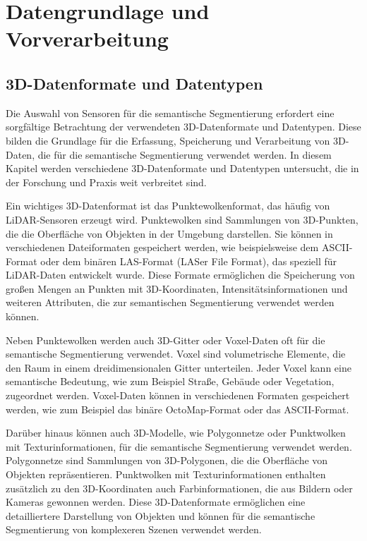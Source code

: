 \chapter{Datengrundlage und Vorverarbeitung}

\section{3D-Datenformate und Datentypen}
Die Auswahl von Sensoren für die semantische Segmentierung erfordert eine
sorgfältige Betrachtung der verwendeten 3D-Datenformate und Datentypen. Diese
bilden die Grundlage für die Erfassung, Speicherung und Verarbeitung von
3D-Daten, die für die semantische Segmentierung verwendet werden. In diesem
Kapitel werden verschiedene 3D-Datenformate und Datentypen untersucht, die in
der Forschung und Praxis weit verbreitet sind.

Ein wichtiges 3D-Datenformat ist das Punktewolkenformat, das häufig von
LiDAR-Sensoren erzeugt wird. Punktewolken sind Sammlungen von 3D-Punkten, die
die Oberfläche von Objekten in der Umgebung darstellen. Sie können in
verschiedenen Dateiformaten gespeichert werden, wie beispielsweise dem
ASCII-Format oder dem binären LAS-Format (LASer File Format), das speziell für
LiDAR-Daten entwickelt wurde. Diese Formate ermöglichen die Speicherung von
großen Mengen an Punkten mit 3D-Koordinaten, Intensitätsinformationen und
weiteren Attributen, die zur semantischen Segmentierung verwendet werden
können.

Neben Punktewolken werden auch 3D-Gitter oder Voxel-Daten oft für die
semantische Segmentierung verwendet. Voxel sind volumetrische Elemente, die den
Raum in einem dreidimensionalen Gitter unterteilen. Jeder Voxel kann eine
semantische Bedeutung, wie zum Beispiel Straße, Gebäude oder Vegetation,
zugeordnet werden. Voxel-Daten können in verschiedenen Formaten gespeichert
werden, wie zum Beispiel das binäre OctoMap-Format oder das ASCII-Format.

Darüber hinaus können auch 3D-Modelle, wie Polygonnetze oder Punktwolken mit
Texturinformationen, für die semantische Segmentierung verwendet werden.
Polygonnetze sind Sammlungen von 3D-Polygonen, die die Oberfläche von Objekten
repräsentieren. Punktwolken mit Texturinformationen enthalten zusätzlich zu den
3D-Koordinaten auch Farbinformationen, die aus Bildern oder Kameras gewonnen
werden. Diese 3D-Datenformate ermöglichen eine detailliertere Darstellung von
Objekten und können für die semantische Segmentierung von komplexeren Szenen
verwendet werden.

